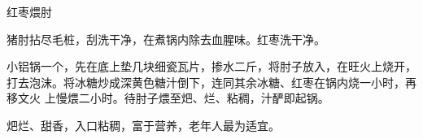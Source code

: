 %
%
%
%
%
%
%
\begin{recipe}{红枣煨肘}

\ingredients


\preparation

\step 猪肘拈尽毛桩，刮洗干净，在煮锅内除去血腥味。红枣洗干净。

\step 小铝锅一个，先在底上垫几块细瓷瓦片，掺水二斤，将肘子放入，在旺火上烧开，
打去泡沫。将冰糖炒成深黄色糖汁倒下，连同其余冰糖、红枣在锅内烧一小时，再移文火
上慢煨二小时。待肘子煨至𤆵、烂、粘稠，汁酽即起锅。

\features

𤆵烂、甜香，入口粘稠，富于营养，老年人最为适宜。

\end{recipe}


